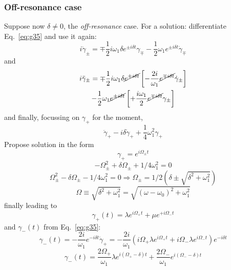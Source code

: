 \documentclass[12pt]{article}
\newcommand{\be}{\begin{equation}}
\newcommand{\ee}{\end{equation}}
\begin{document}
\subsubsection{Off-resonance case}

Suppose now $\delta \neq 0$, the \emph{off-resonance} case.
For a solution: differentiate Eq.~\eqref{eq:g35} and use it again:
\[
i \ddot{\gamma}_{\pm}=\mp \frac{1}{2} i \omega_{1} \delta e^{\pm i \delta t} \gamma_{\mp}-\frac{1}{2} \omega_{1} e^{\pm i \delta t} \dot{\gamma}_{\mp}
\]
and
\[
\begin{gathered}
i \ddot{\gamma}_\pm = \mp \frac{1}{2} i \omega_1 \delta 
\cancel{e^{\pm i \delta t}}
\left[
-\frac{2i}{\omega_1} \cancel{e^{\mp i \delta t}}
\dot{\gamma}_\pm
\right]\\
-\frac{1}{2} \omega_1 \cancel{e^{\pm i \delta t}}
\left[
+\frac{i \omega_1}{2} \cancel{e^{\mp i \delta t}}
\gamma_\pm
\right]
\end{gathered}
\]
and finally, focussing on $\gamma_+$ for the moment,
\be
\boxed{
\ddot{\gamma}_{+}-i \delta \dot{\gamma}_{+}+ \frac{1}{4} \omega_{1}^{2} \gamma_{+}
}
\ee
Propose solution in the form
\be
\gamma_{+}=e^{i \Omega_{\pm} t}
\ee
\[
-\Omega_{\pm}^{2}+\delta \Omega_{\pm} +1/4 \omega_{1}^{2}=0
\]
\[
\Omega_{\pm}^{2}-\delta \Omega_\pm -1/4 \omega_{1}^{2}=0 \Rightarrow \Omega_{\pm}= 1/2
\left(\delta \pm \sqrt{\delta^{2}+\omega_{1}^{2}}\right)
\]
\be
\Omega \equiv \sqrt{\delta^{2}+\omega_{1}^{2}}=\sqrt{\left(\omega-\omega_{0}\right)^{2}+\omega_{1}^{2}}
\ee
finally leading to
\be
\gamma_{+}(t)=\lambda e^{i \Omega_{+} t}+\mu e^{+i \Omega_{-} t}
\ee
and $\gamma_{-}(t)$ from Eq.~\eqref{eq:g35}:
\be
\gamma_{-}(t)=
-\frac{2 i}{\omega_{1}} e^{-i \delta t} \dot{\gamma}_{+}=
-\frac{2 i}{\omega_{1}} 
\left( 
i \Omega_{+} \lambda e^{i \Omega_{+} t} +
i \Omega_{-} \lambda e^{i \Omega_{-} t}
\right)
e^{-i \delta t}
\ee
\be
\gamma_{-}(t)=\frac{2 \Omega_{+}}{\omega_{1}} \lambda e^{i\left(\Omega_{+}-\delta\right) t}+\frac{2 \Omega_{-}}{\omega_{1}} e^{i\left(\Omega_{-}-\delta\right) t}
\ee
\end{document}

